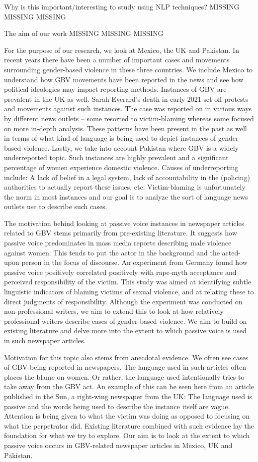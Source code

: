 \documentclass{article}
\begin{document}
{Why is this important/interesting to study using NLP techniques?
MISSING MISSING MISSING


The aim of our work
MISSING MISSING MISSING

For the purpose of our research, we look at Mexico, the UK and Pakistan. In recent years there have been a number of important cases and movements surrounding gender-based violence in these three countries. We include Mexico to understand how GBV movements have been reported in the news and see how political ideologies may impact reporting methods. Instances of GBV are prevalent in the UK as well. Sarah Everard's death in early 2021 set off protests and movements against such instances. The case was reported on in various ways by different news outlets – some resorted to victim-blaming whereas some focused on more in-depth analysis. These patterns have been present in the past as well in terms of what kind of language is being used to depict instances of gender-based violence. Lastly, we take into account Pakistan where GBV is a widely underreported topic. Such instances are highly prevalent and a significant percentage of women experience domestic violence. Causes of underreporting include: A lack of belief in a legal system, lack of accountability in the (policing) authorities to actually report these issues, etc. Victim-blaming is unfortunately the norm in most instances and our goal is to analyze the sort of language news outlets use to describe such cases.

The motivation behind looking at passive voice instances in newspaper articles related to GBV stems primarily from pre-existing literature. It suggests how passive voice predominates in mass media reports describing male violence against women. This tends to put the actor in the background and the acted-upon person in the focus of discourse. An experiment from Germany found how passive voice positively correlated positively with rape-myth acceptance and perceived responsibility of the victim. This study was aimed at identifying subtle linguistic indicators of blaming victims of sexual violence, and at relating these to direct judgments of responsibility. Although the experiment was conducted on non-professional writers, we aim to extend this to look at how relatively professional writers describe cases of gender-based violence. We aim to build on existing literature and delve more into the extent to which passive voice is used in such newspaper articles.

Motivation for this topic also stems from anecdotal evidence. We often see cases of GBV being reported in newspapers. The language used in such articles often places the blame on women. Or rather, the language used intentionally tries to take away from the GBV act. An example of this can be seen here from an article published in the Sun, a right-wing newspaper from the UK: 
The language used is passive and the words being used to describe the instance itself are vague. Attention is being given to what the victim was doing as opposed to focusing on what the perpetrator did. Existing literature combined with such evidence lay the foundation for what we try to explore. Our aim is to look at the extent to which passive voice occurs in GBV-related newspaper articles in Mexico, UK and Pakistan.

}
\end{document}
